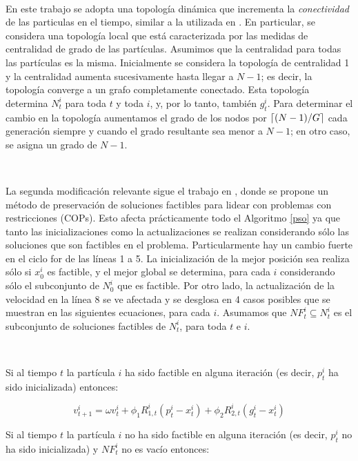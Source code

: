 \documentclass{article}
\DeclarePairedDelimiter\ceil{\lceil}{\rceil}
\begin{document}
\ 

En este trabajo se adopta una topología dinámica que incrementa la \textit{conectividad} de las particulas en el tiempo, similar a la utilizada en \cite{suganthan99}. En particular, se considera una topología local que está caracterizada por las medidas de centralidad de grado de las partículas. Asumimos que la centralidad para todas las partículas es la misma. Inicialmente se considera la topología de centralidad 1 y la centralidad aumenta sucesivamente hasta llegar a $N - 1$; es decir, la topología converge a un grafo completamente conectado. Esta topología determina $N_t^i$ para toda $t$ y toda $i$, y, por lo tanto, también $g_t^i$. Para determinar el cambio en la topología aumentamos el grado de los nodos por $\ceil{(N - 1) / G}$ cada generación siempre y cuando el grado resultante sea menor a $N - 1$; en otro caso, se asigna un grado de $N - 1$. 

\

La segunda modificación relevante sigue el trabajo en \cite{xiahoui02}, donde se propone un método de preservación de soluciones factibles para lidear con problemas con restricciones (COPs). Esto afecta prácticamente todo el Algoritmo \ref{pso} ya que tanto las inicializaciones como la actualizaciones se realizan considerando sólo las soluciones que son factibles en el problema. Particularmente hay un cambio fuerte en el ciclo for de las líneas 1 a 5. La inicialización de la mejor posición sea realiza sólo si $x_0^i$ es factible, y el mejor global se determina, para cada $i$ considerando sólo el subconjunto de $N_0^i$ que es factible. Por otro lado, la actualización de la velocidad en la línea 8 se ve afectada y se desglosa en 4 casos posibles que se muestran en las siguientes ecuaciones, para cada $i$. Asumamos que $NF_t^i \subseteq N_t^i$  es el subconjunto de soluciones factibles de $N_t^i$, para toda $t$ e $i$.

\

Si al tiempo $t$ la partícula $i$ ha sido factible en alguna iteración (es decir, $p_t^i$ ha sido inicializada) entonces: 

\begin{equation}
    \label{my_pso1}
    v_{t + 1}^i = \omega v_t^i + \phi_1 R_{1,t}^i(p_t^i- x_t^i) + \phi_2 R_{2,t}^i(g_t^i- x_t^i) 
\end{equation}{}

Si al tiempo $t$ la partícula $i$ no ha sido factible en alguna iteración (es decir, $p_t^i$ no ha sido inicializada) y $NF_t^i$ no es vacío entonces: 
\end{document}
